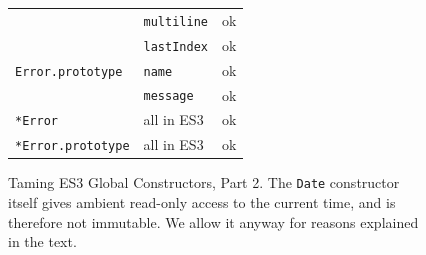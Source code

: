 \documentclass[letterpaper,twocolumn,10pt]{article}
\newcommand{\code}[1]{{\tt {#1}}}              %
\begin{document}
\begin{figure}
\begin{tabular}{lll}
                                 & \code{multiline}            & ok \\
                                 & \code{lastIndex}            & ok \\
  \hline 
  \code{Error.prototype}         & \code{name}                 & ok \\
                                 & \code{message}              & ok \\
  \code{*Error}                  &                  all in ES3 & ok \\
  \code{*Error.prototype}        &                  all in ES3 & ok \\
  
\end{tabular}

\caption[Taming ES3 Global Constructors, Part 2.]{Taming ES3 Global
Constructors, Part 2. The \code{Date} constructor itself gives ambient
read-only access to the current time, and is therefore not immutable.
We allow it anyway for reasons explained in the text.} 

\label{tab:taming-es3-2}
\end{figure}




\end{document}

